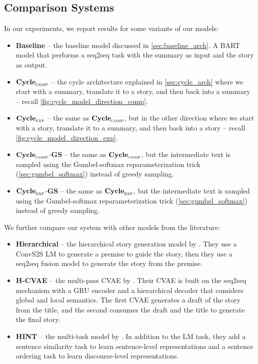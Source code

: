 \subsection{Comparison Systems}

In our experiments, we report results for some variants of our models:

\begin{itemize}
\item \textbf{Baseline} -- the baseline model discussed in \cref{sec:baseline_arch}. A BART model that performs a seq2seq task with the summary as input and the story as output.

\item $\textbf{Cycle}_{\textsc{comp}}$ -- the cycle architecture explained in \cref{sec:cycle_arch} where we start with a summary, translate it to a story, and then back into a summary -- recall \cref{fig:cycle_model_direction_comp}.

\item $\textbf{Cycle}_{\textsc{exp}}$ -- the same as $\textbf{Cycle}_{\textsc{comp}}$, but in the other direction where we start with a story, translate it to a summary, and then back into a story  -- recall \cref{fig:cycle_model_direction_exp}.

\item $\textbf{Cycle}_{\textsc{comp}}$-\textbf{GS} -- the same as $\textbf{Cycle}_{\textsc{comp}}$, but the intermediate text is sampled using the Gumbel-softmax reparameterization trick (\cref{sec:gumbel_softmax}) instead of greedy sampling.

\item $\textbf{Cycle}_{\textsc{exp}}$-\textbf{GS} -- the same as $\textbf{Cycle}_{\textsc{exp}}$, but the intermediate text is sampled using the Gumbel-softmax reparameterization trick (\cref{sec:gumbel_softmax}) instead of greedy sampling.
\end{itemize}


We further compare our system with other models from the literature:

\begin{itemize}
\item \textbf{Hierarchical} -- the hierarchical story generation model by \citep{fan2018hierarchical}. They use a ConvS2S LM to generate a premise to guide the story, then they use a seq2seq fusion model to generate the story from the premise.

\item \textbf{H-CVAE} -- the multi-pass CVAE by \citep{yu2020draft}. Their CVAE is built on the seq2seq mechanism with a GRU encoder and a hierarchical decoder that considers global and local semantics. The first CVAE generates a draft of the story from the title, and the second consumes the draft and the title to generate the final story.

\item \textbf{HINT} -- the multi-task model by \citep{guan2021long}. In addition to the LM task, they add a sentence similarity task to learn sentence-level representations and a sentence ordering task to learn discourse-level representations.
\end{itemize}

